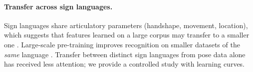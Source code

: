 \paragraph{Transfer across sign languages.}
Sign languages share articulatory parameters (handshape, movement, location), which suggests that
features learned on a large corpus may transfer to a smaller one \citep{yosinski2014transferable}.
Large-scale pre-training improves recognition on smaller datasets of the \emph{same} language
\citep{albanie2020bsl1k}. Transfer between distinct sign languages from pose data alone has
received less attention; we provide a controlled study with learning curves.

